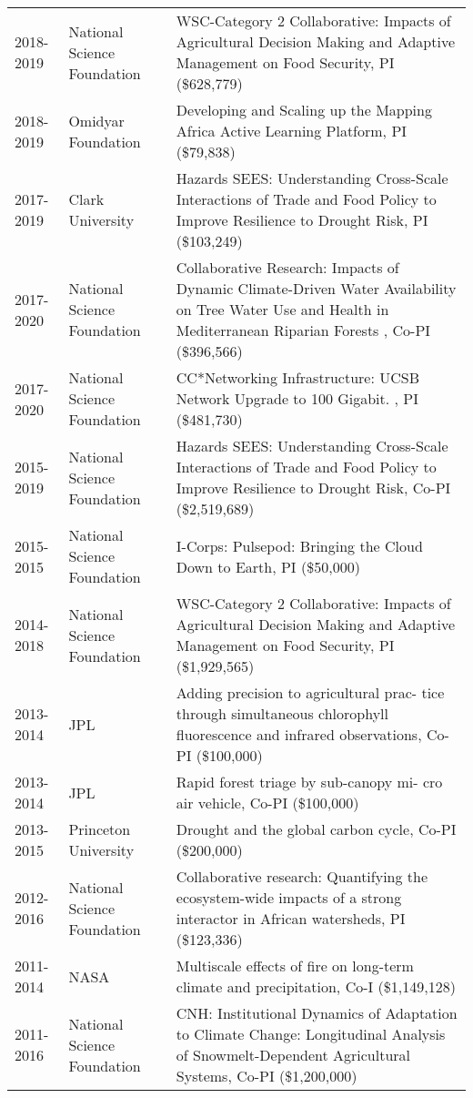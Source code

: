 \begin{longtable}{p{1.75cm}>{\raggedright}p{}p{12cm}}
2018-2019 & National Science Foundation & WSC-Category 2 Collaborative: Impacts of Agricultural Decision Making and Adaptive Management on Food Security, PI (\$628,779) \\ 
2018-2019 & Omidyar Foundation & Developing and Scaling up the Mapping Africa Active Learning Platform, PI (\$79,838) \\ 
2017-2019 & Clark University & Hazards SEES: Understanding Cross-Scale Interactions of Trade and Food Policy to Improve Resilience to Drought Risk, PI (\$103,249) \\ 
2017-2020 & National Science Foundation & Collaborative Research: Impacts of Dynamic Climate-Driven Water Availability on Tree Water Use and Health in Mediterranean Riparian Forests 
, Co-PI (\$396,566) \\ 
2017-2020 & National Science Foundation & CC*Networking Infrastructure: UCSB Network Upgrade to 100 Gigabit. , PI (\$481,730) \\ 
2015-2019 & National Science Foundation & Hazards SEES: Understanding Cross-Scale Interactions of Trade and Food Policy to Improve Resilience to Drought Risk, Co-PI (\$2,519,689) \\ 
2015-2015 & National Science Foundation & I-Corps: Pulsepod: Bringing the Cloud Down to Earth, PI (\$50,000) \\ 
2014-2018 & National Science Foundation & WSC-Category 2 Collaborative: Impacts of Agricultural Decision Making and Adaptive Management on Food Security, PI (\$1,929,565) \\ 
2013-2014 & JPL & Adding precision to agricultural prac- tice through simultaneous chlorophyll fluorescence and infrared observations, Co-PI (\$100,000) \\ 
2013-2014 & JPL & Rapid forest triage by sub-canopy mi- cro air vehicle, Co-PI (\$100,000) \\ 
2013-2015 & Princeton University & Drought and the global carbon cycle, Co-PI (\$200,000) \\ 
2012-2016 & National Science Foundation & Collaborative research: Quantifying the ecosystem-wide impacts of a strong interactor in African watersheds, PI (\$123,336) \\ 
2011-2014 & NASA & Multiscale effects of fire on long-term climate and precipitation, Co-I (\$1,149,128) \\ 
2011-2016 & National Science Foundation & CNH: Institutional Dynamics of Adaptation to Climate Change: Longitudinal Analysis of Snowmelt-Dependent Agricultural Systems, Co-PI (\$1,200,000) \\ 

\end{longtable}
